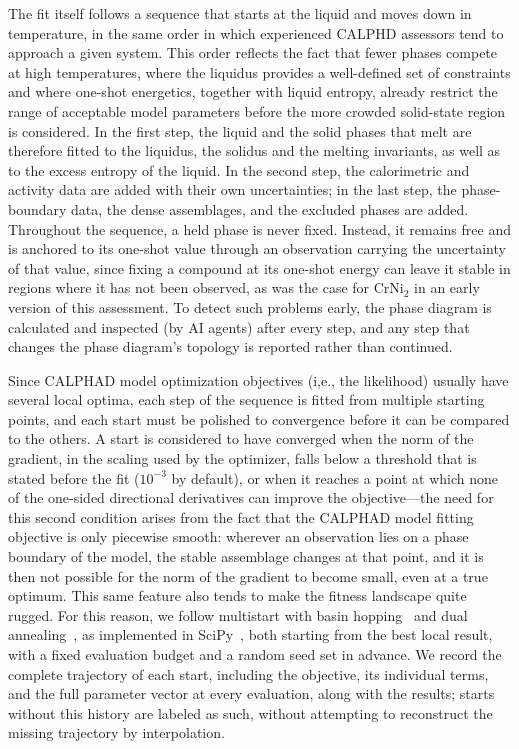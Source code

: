 The fit itself follows a sequence that starts at the liquid and moves down in temperature, in the same order in which experienced CALPHD assessors tend to approach a given system. This order reflects the fact that fewer phases compete at high temperatures, where the liquidus provides a well-defined set of constraints and where one-shot energetics, together with liquid entropy, already restrict the range of acceptable model parameters before the more crowded solid-state region is considered. In the first step, the liquid and the solid phases that melt are therefore fitted to the liquidus, the solidus and the melting invariants, as well as to the excess entropy of the liquid. In the second step, the calorimetric and activity data are added with their own uncertainties; in the last step, the phase-boundary data, the dense assemblages, and the excluded phases are added. Throughout the sequence, a held phase is never fixed. Instead, it remains free and is anchored to its one-shot value through an observation carrying the uncertainty of that value, since fixing a compound at its one-shot energy can leave it stable in regions where it has not been observed, as was the case for CrNi$_2$ in an early version of this assessment. To detect such problems early, the phase diagram is calculated and inspected (by AI agents) after every step, and any step that changes the phase diagram's topology is reported rather than continued.

Since CALPHAD model optimization objectives (i,e., the likelihood) usually have several local optima, each step of the sequence is fitted from multiple starting points, and each start must be polished to convergence before it can be compared to the others. A start is considered to have converged when the norm of the gradient, in the scaling used by the optimizer, falls below a threshold that is stated before the fit ($10^{-3}$ by default), or when it reaches a point at which none of the one-sided directional derivatives can improve the objective---the need for this second condition arises from the fact that the CALPHAD model fitting objective is only piecewise smooth: wherever an observation lies on a phase boundary of the model, the stable assemblage changes at that point, and it is then not possible for the norm of the gradient to become small, even at a true optimum. This same feature also tends to make the fitness landscape quite rugged. For this reason, we follow multistart with basin hopping~\cite{wales1997basinhopping} and dual annealing~\cite{xiang1997dualannealing}, as implemented in SciPy~\cite{virtanen2020scipy}, both starting from the best local result, with a fixed evaluation budget and a random seed set in advance. We record the complete trajectory of each start, including the objective, its individual terms, and the full parameter vector at every evaluation, along with the results; starts without this history are labeled as such, without attempting to reconstruct the missing trajectory by interpolation.

